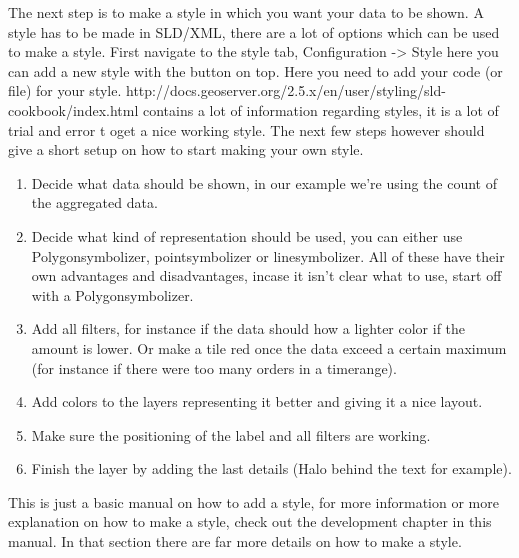 The next step is to make a style in which you want your data to be shown. A style has to be made in SLD/XML, there are a lot of options which can be used to make a style. First navigate to the style tab, Configuration -> Style here you can add a new style with the button on top. Here you need to add your code (or file) for your style.
\newline
\newline http://docs.geoserver.org/2.5.x/en/user/styling/sld-cookbook/index.html contains a lot of information regarding styles, it is a lot of trial and error t oget a nice working style. The next few steps however should give a short setup on how to start making your own style.
\begin{enumerate}
	\item Decide what data should be shown, in our example we’re using the count of the aggregated data.
	\item Decide what kind of representation should be used, you can either use Polygonsymbolizer, pointsymbolizer or linesymbolizer. All of these have their own advantages and disadvantages, incase it isn't clear what to use, start off with a Polygonsymbolizer.
	\item Add all filters, for instance if the data should how a lighter color if the amount is lower. Or make a tile red once the data exceed a certain maximum (for instance if there were too many orders in a timerange).
	\item Add colors to the layers representing it better and giving it a nice layout.
	\item Make sure the positioning of the label and all filters are working.
	\item Finish the layer by adding the last details (Halo behind the text for example).
\end{enumerate}
	This is just a basic manual on how to add a style, for more information or more explanation on how to make a style, check out the development chapter in this manual. In that section there are far more details on how to make a style.